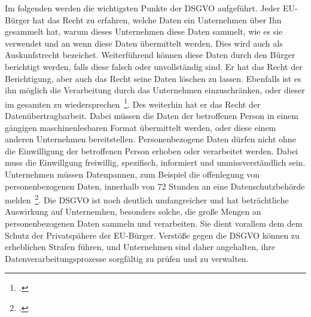 Im folgenden werden die wichtigsten Punkte der \ac{DSGVO} aufgeführt. Jeder \ac{EU}-Bürger hat das Recht zu erfahren, welche Daten ein Unternehmen über Ihn gesammelt hat, warum dieses Unternehmen
diese Daten sammelt, wie es sie verwendet und an wenn diese Daten übermittelt werden. Dies wird auch als Auskunfstrecht bezeichet. Weiterführend können diese Daten durch den Bürger
berichtigt werden, falls diese falsch oder unvollständig sind. Er hat das Recht der Berichtigung, aber auch das Recht seine Daten löschen zu lassen. Ebenfalls ist es ihn möglich die 
Verarbeitung durch das Unternehmen einzuschränken, oder dieser im gesamten zu wiedersprechen~\footcite[\vglf][]{Voigt.2018}. Des weiterhin hat er das Recht der Datenübertragbarbeit. Dabei müssen die Daten der
betroffenen Person in einem gängigen maschinenlesbaren Format übermittelt werden, oder diese einem anderen Unternehmen bereitstellen.
Personenbezogene Daten dürfen nicht ohne die Einwilligung der betroffenen Person erhoben oder verarbeitet werden. Dabei muss die Einwillgung freiwillig, spezifisch, informiert und
unmissverständlich sein.
Unternehmen müssen Datenpannen, zum Beispiel die offenlegung von personenbezogenen Daten, innerhalb von 72 Stunden an eine Datenschutzbehörde melden~\footcite[\vglf][]{Voigt.2018}.
Die \ac{DSGVO} ist noch deutlich umfangreicher und hat beträchtliche Auswirkung auf Unternemhen, besonders solche, die große Mengen an personenbezogenen Daten sammeln und verarbeiten.
Sie dient vorallem dem dem Schutz der Privatspähere der \ac{EU}-Bürger.
Verstöße gegen die DSGVO können zu erheblichen Strafen führen, und Unternehmen sind daher angehalten, ihre Datenverarbeitungsprozesse sorgfältig zu prüfen und zu verwalten.